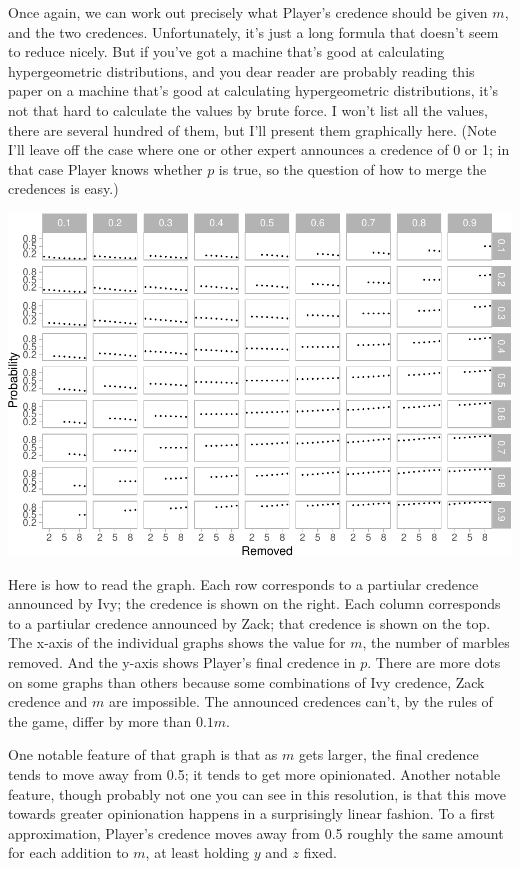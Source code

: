 \documentclass[
  12pt,
]{article}
\begin{document}
Once again, we can work out precisely what Player's credence should be
given \(m\), and the two credences. Unfortunately, it's just a long
formula that doesn't seem to reduce nicely. But if you've got a machine
that's good at calculating hypergeometric distributions, and you dear
reader are probably reading this paper on a machine that's good at
calculating hypergeometric distributions, it's not that hard to
calculate the values by brute force. I won't list all the values, there
are several hundred of them, but I'll present them graphically here.
(Note I'll leave off the case where one or other expert announces a
credence of 0 or 1; in that case Player knows whether \(p\) is true, so
the question of how to merge the credences is easy.)

\includegraphics{mixing-experts-not-anon_files/figure-latex/unnamed-chunk-2-1.pdf}

Here is how to read the graph. Each row corresponds to a partiular
credence announced by Ivy; the credence is shown on the right. Each
column corresponds to a partiular credence announced by Zack; that
credence is shown on the top. The x-axis of the individual graphs shows
the value for \(m\), the number of marbles removed. And the y-axis shows
Player's final credence in \(p\). There are more dots on some graphs
than others because some combinations of Ivy credence, Zack credence and
\(m\) are impossible. The announced credences can't, by the rules of the
game, differ by more than \(0.1m\).

One notable feature of that graph is that as \(m\) gets larger, the
final credence tends to move away from 0.5; it tends to get more
opinionated. Another notable feature, though probably not one you can
see in this resolution, is that this move towards greater opinionation
happens in a surprisingly linear fashion. To a first approximation,
Player's credence moves away from 0.5 roughly the same amount for each
addition to \(m\), at least holding \(y\) and \(z\) fixed.
\end{document}
